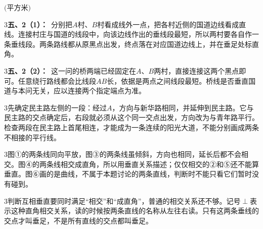 \documentclass[multi=snippet,border={5bp 20bp 5bp 5bp}]{standalone}
\newenvironment{snippet}[3]{\begin{minipage}{#1bp}\color{answerred}\fontsize{#2}{#3}\selectfont\raggedright}{\end{minipage}}
\begin{document}
\begin{snippet}{80}{9.5}{14}\SourceSans\setlength{\mathindent}{2bp}\(\text{(平方米)}\)\end{snippet}
\begin{snippet}{505}{11.5}{14}\begin{multicols}{3}\raggedcolumns \textbf{五、2（1）：}\ 分别把\(A\)\allowbreak 村、\(B\)\allowbreak 村看成线外一点，把各村近侧的国道边线看成直线。连接村庄与国道的线段中，向该边线作出的垂线段最短，所以两村要各自作一条垂线段。两条路线都从原黑点出发，终点落在对应国道边线上，并在垂足处标直角。\end{multicols}\end{snippet}
\begin{snippet}{505}{11.5}{14}\begin{multicols}{3}\raggedcolumns \textbf{五、2（2）：}\ 这一问的桥两端已经固定在\(A\)\allowbreak 、\(B\)\allowbreak 两村，直接连接这两个黑点即可。任意绕行路线都会比线段\(AB\)\allowbreak 长，依据是两点之间线段最短。桥线是否垂直国道与本问无关，应以连接两个指定端点为准。\end{multicols}\end{snippet}
\begin{snippet}{505}{11.5}{14}\begin{multicols}{3}\raggedcolumns 先确定民主路左侧的一段：经过\(A\)\allowbreak ，方向与新华路相同，并延伸到民主路。它与民主路的交点确定后，右段就必须从这个同一交点出发，方向改为与青年路平行。检查两段在民主路上首尾相连，才能成为一条连续的阳光大道，不能分别画成两条不相接的平行线。\end{multicols}\end{snippet}
\begin{snippet}{505}{11.5}{14}\begin{multicols}{3}\raggedcolumns 图①的两条线同向平放，图③的两条线虽倾斜，方向也相同，延长后都不会相交。图④的两条线相交成直角，所以用垂直关系描述；仅仅相交的②和⑤还不能算垂直。图⑥画的是曲线，不属于本题讨论的两条直线，判断时不能只看它们暂时没有碰到。\end{multicols}\end{snippet}
\begin{snippet}{505}{11.5}{14}\begin{multicols}{3}\raggedcolumns 判断互相垂直要同时满足“相交”和“成直角”，普通的相交关系还不够。记号\(\perp\)\allowbreak 表示这种直角相交关系，读的时候按两条直线的名称从左往右读。只有这两条垂线的交点才叫垂足，不是所有直线的交点都叫垂足。\end{multicols}\end{snippet}
\end{document}
